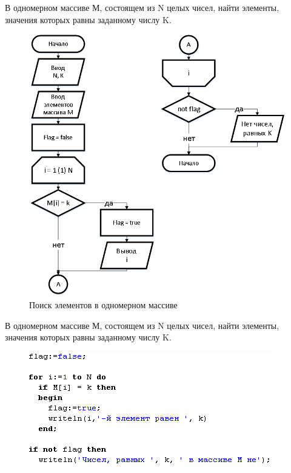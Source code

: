 \documentclass{beamer}
\begin{document}
\begin{frame}
В одномерном массиве М, состоящем из N целых чисел, найти элементы, значения которых равны заданному числу K.
\begin{figure}[h]
\centering
\includegraphics[scale=0.35]{images/array_search.png}
\caption{Поиск элементов в одномерном массиве}
\label{pic-search}
\end{figure}
\end{frame}

\begin{frame}
В одномерном массиве М, состоящем из N целых чисел, найти элементы, значения которых равны заданному числу K.
\begin{figure}[h]
\centering
\includegraphics[scale=1.0]{images/array_search_code.png}
\label{pic-search-code}
\end{figure}
\end{frame}
\end{document}

